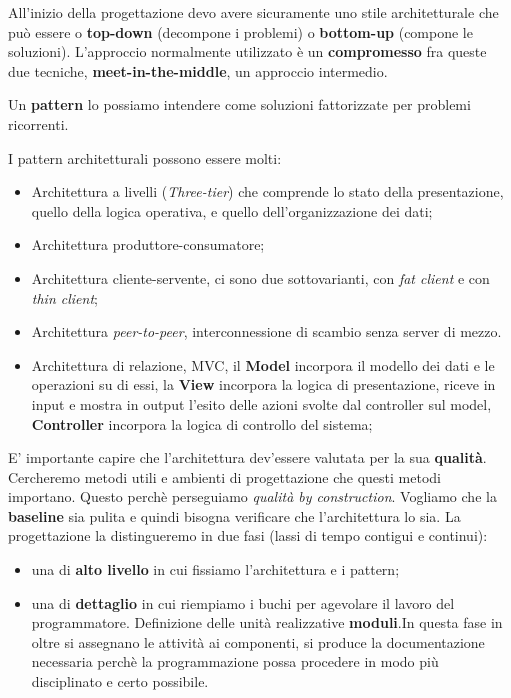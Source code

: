 All'inizio della progettazione devo avere sicuramente uno stile architetturale che può essere o \textbf{top-down} (decompone i problemi) o \textbf{bottom-up} (compone le soluzioni). L'approccio normalmente utilizzato è un \textbf{compromesso} fra queste due tecniche, \textbf{meet-in-the-middle}, un approccio intermedio.

Un \textbf{pattern} lo possiamo intendere come soluzioni fattorizzate per problemi ricorrenti.

I  pattern architetturali possono essere molti:

\begin{itemize}
	\item Architettura a livelli (\textit{Three-tier}) che comprende lo stato della presentazione, quello della logica operativa, e quello dell'organizzazione dei dati;
	\item Architettura produttore-consumatore;
	\item Architettura cliente-servente, ci sono due sottovarianti, con \textit{fat client} e con \textit{thin client};
	\item Architettura \textit{peer-to-peer}, interconnessione di scambio senza server di mezzo.
	\item Architettura di relazione, MVC, il \textbf{Model} incorpora il modello dei dati e le operazioni su di essi, la \textbf{View} incorpora la logica di presentazione, riceve in input e mostra in output l'esito delle azioni svolte dal controller sul model, \textbf{Controller} incorpora la logica di controllo del sistema;
\end{itemize}

E' importante capire che l'architettura dev'essere valutata per la sua \textbf{qualità}. Cercheremo metodi utili e ambienti di progettazione che questi metodi importano. Questo perchè perseguiamo \textit{qualità by construction}. Vogliamo che la \textbf{baseline} sia pulita e quindi bisogna verificare che l'architettura lo sia. La progettazione la distingueremo in due fasi (lassi di tempo contigui e continui):

\begin{itemize}

	\item una di \textbf{alto livello} in cui fissiamo l'architettura e i pattern;
	\item una di \textbf{dettaglio} in cui riempiamo i buchi per agevolare il lavoro del programmatore. Definizione delle unità realizzative \textbf{moduli}.In questa fase in oltre si assegnano le attività ai componenti, si produce la documentazione necessaria perchè la programmazione possa procedere in modo più disciplinato e certo possibile.

\end{itemize}

